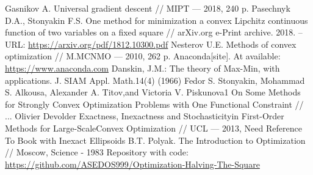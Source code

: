 \documentclass[12pt]{article}
\begin{document}
\newpage
\begin{thebibliography}{3}
Gasnikov A.  Universal gradient descent // MIPT --- 2018, 240 p.
Pasechnyk D.A., Stonyakin F.S.  One method for minimization a convex Lipchitz continuous function of two variables on a fixed square // arXiv.org e-Print archive. 2018. – URL: \href{https://arxiv.org/pdf/1812.10300.pdf}{https://arxiv.org/pdf/1812.10300.pdf}
Nesterov U.E.  Methods of convex optimization // M.MCNMO --- 2010, 262 p.
Anaconda[site]. At available: \href{https://www.anaconda.com}{https://www.anaconda.com}
Danskin, J.M.: The theory of Max-Min, with applications. J. SIAM Appl. Math.14(4) (1966)
Fedor S. Stonyakin, Mohammad S. Alkousa, Alexander A. Titov,and Victoria V. Piskunova1 On Some Methods for Strongly Convex Optimization Problems with One Functional Constraint // ...
Olivier Devolder Exactness, Inexactness and Stochasticityin First-Order Methods for Large-ScaleConvex Optimization // UCL --- 2013,
Need Reference To Book with Inexact Ellipsoids
B.T. Polyak. The Introduction to Optimization // Moscow, Science - 1983
Repository with code: \href{https://github.com/ASEDOS999/Optimization-Halving-The-Square}{https://github.com/ASEDOS999/Optimization-Halving-The-Square}
\end{thebibliography}
\end{document}
